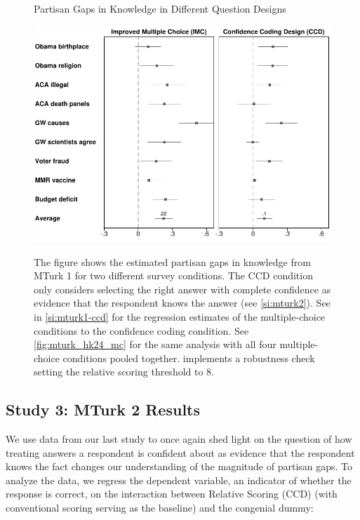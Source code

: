 \documentclass[12pt, letterpaper]{article}
\begin{document}
\begin{center}
    \begin{figure}[ht]
        \centering
        \caption{Partisan Gaps in Knowledge in Different Question Designs}
        \includegraphics[width=.9\textwidth]{../figs/partisan-gap-by-item-arm-14k-24k.pdf}
        \label{fig:mturk_hk24}
        \caption*{\footnotesize
            The figure shows the estimated partisan gaps in knowledge from MTurk 1 for two different survey conditions. The CCD condition only considers selecting the right answer with complete confidence as evidence that the respondent knows the answer (see \cref{si:mturk2}).
            See  in \cref{si:mturk1-ccd} for the regression estimates of the multiple-choice conditions to the confidence coding condition.
            See \cref{fig:mturk_hk24_mc} for the same analysis with all four multiple-choice conditions pooled together.
             implements a robustness check setting the relative scoring threshold to 8.
        }
    \end{figure}
\end{center}

\subsection*{Study 3: MTurk 2 Results}

We use data from our last study to once again shed light on the question of how treating answers a respondent is confident about as evidence that the respondent knows the fact changes our understanding of the magnitude of partisan gaps. To analyze the data, we regress the dependent variable, an indicator of whether the response is correct, on the interaction between Relative Scoring (CCD) (with conventional scoring serving as the baseline) and the congenial dummy:
\end{document}
